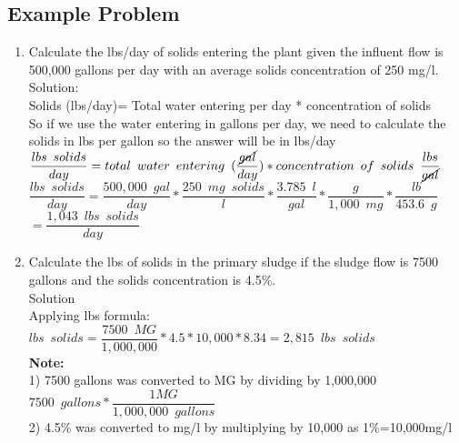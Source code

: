 \subsection{Example Problem}
\begin{enumerate}
\item Calculate the lbs/day of solids entering the plant given the influent flow is 500,000 gallons per day with an average solids concentration  of 250 mg/l.\\
\vspace{0.3cm}
Solution:\\
\vspace{0.3cm}
Solids (lbs/day)= Total water entering per day * concentration of solids\\
\vspace{0.3cm}
So if we use the water entering in gallons per day, we need to calculate the solids in lbs per gallon so the answer will be in lbs/day\\
\vspace{0.3cm}
$\dfrac{lbs \enspace solids}{day}= total\enspace  water \enspace  entering \enspace (\dfrac{\cancel{gal}}{day}) * concentration \enspace of \enspace  solids \enspace  \dfrac{lbs}{\cancel{gal}}$\\
\vspace{0.3cm}
$\dfrac{lbs \enspace solids}{day}= \dfrac{500,000 \enspace gal}{day}* \dfrac{250 \enspace mg \enspace solids}{l} *\dfrac{3.785 \enspace l}{gal}*\dfrac{g}{1,000 \enspace mg}*\dfrac{lb}{453.6 \enspace g}$\\
\vspace{0.3cm}
$=\dfrac{1,043 \enspace lbs \enspace solids}{day}$
\vspace{0.3cm}
\item Calculate the lbs of solids in the primary sludge if the sludge flow is 7500 gallons and the solids concentration is 4.5\%.\\
Solution\\
Applying lbs formula:\\
$lbs \enspace solids = \dfrac{7500 \enspace MG}{1,000,000} * 4.5*10,000 *8.34 = \boxed{2,815 \enspace lbs \enspace solids}$\\
\textbf{Note:}\\  
1) 7500 gallons was converted to MG by dividing by 1,000,000\\
$7500 \enspace gallons * \dfrac{1 MG}{1,000,000 \enspace gallons}$\\
2) 4.5\% was converted to mg/l by multiplying by 10,000 as 1\%=10,000mg/l
\end{enumerate}

